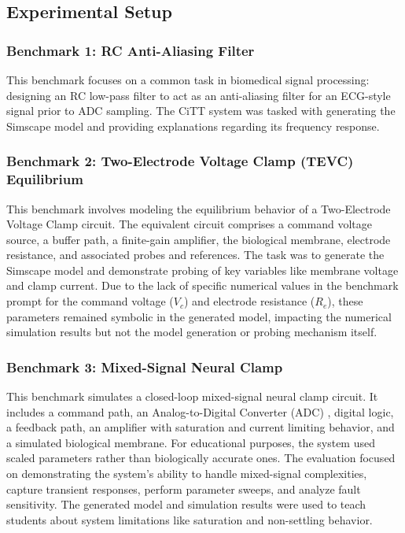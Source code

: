 \documentclass[10pt,twocolumn,letterpaper]{article}
\begin{document}
\subsection{Experimental Setup}
\label{sec:exp_setup}
\subsubsection{Benchmark 1: RC Anti-Aliasing Filter}
This benchmark focuses on a common task in biomedical signal processing: designing an RC low-pass filter to act as an anti-aliasing filter for an ECG-style signal prior to ADC sampling. The CiTT system was tasked with generating the Simscape model and providing explanations regarding its frequency response.

\subsubsection{Benchmark 2: Two-Electrode Voltage Clamp (TEVC) Equilibrium}
This benchmark involves modeling the equilibrium behavior of a Two-Electrode Voltage Clamp circuit. The equivalent circuit comprises a command voltage source, a buffer path, a finite-gain amplifier, the biological membrane, electrode resistance, and associated probes and references. The task was to generate the Simscape model and demonstrate probing of key variables like membrane voltage and clamp current. Due to the lack of specific numerical values in the benchmark prompt for the command voltage ($V_c$) and electrode resistance ($R_e$), these parameters remained symbolic in the generated model, impacting the numerical simulation results but not the model generation or probing mechanism itself.

\subsubsection{Benchmark 3: Mixed-Signal Neural Clamp}
This benchmark simulates a closed-loop mixed-signal neural clamp circuit. It includes a command path, an Analog-to-Digital Converter (ADC) \cite{webster_medical_instrumentation_2020}, digital logic, a feedback path, an amplifier with saturation and current limiting behavior, and a simulated biological membrane. For educational purposes, the system used scaled parameters rather than biologically accurate ones. The evaluation focused on demonstrating the system's ability to handle mixed-signal complexities, capture transient responses, perform parameter sweeps, and analyze fault sensitivity. The generated model and simulation results were used to teach students about system limitations like saturation and non-settling behavior.
\end{document}
